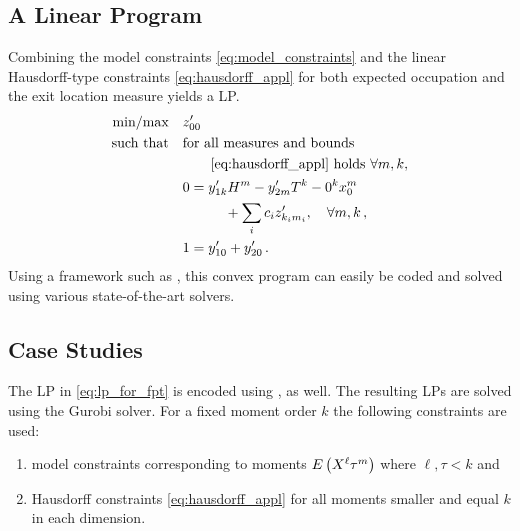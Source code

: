 \subsection{A Linear Program}
Combining the model constraints \eqref{eq:model_constraints} and the linear Hausdorff-type constraints \eqref{eq:hausdorff_appl} for both expected occupation and the exit location measure yields a \ac{LP}.
\begin{equation}\label{eq:lp_for_fpt}
    \begin{split}
	    \text{min} / \text{max} \hspace{1em}&  z_{00}^{\prime} \\
        \text{such that}\hspace{1em} & \text{for all measures and bounds}\\
        &\qquad\eqref{eq:hausdorff_appl}\text{ holds }\forall m, k,\\
        & 0= y_{1k}' H^m -  y_{2m}'T^k - 0^k x_0^m \\
	    &\qquad\quad+\sum_i c_i  z_{k_i m_i}', \quad\forall m, k\,,\\
        & 1 = y_{10}' + y_{20}'\,.
    \end{split}
\end{equation}
Using a framework such as , this convex program can easily be coded and solved using various state-of-the-art solvers.

\subsection{Case Studies}
The \ac{LP} in \eqref{eq:lp_for_fpt} is encoded using , as well.
The resulting \acp{LP} are solved using the Gurobi \parencite{gurobi} solver.
For a fixed moment order $k$ the following constraints are used:
\begin{enumerate}
    \item model constraints corresponding to moments ${E}\left(X^{\ell}{\tau}^{m}\right)$ where $\ell,\tau< k$ and
    \item Hausdorff constraints \eqref{eq:hausdorff_appl} for all moments smaller and equal $k$ in each dimension.
\end{enumerate}

